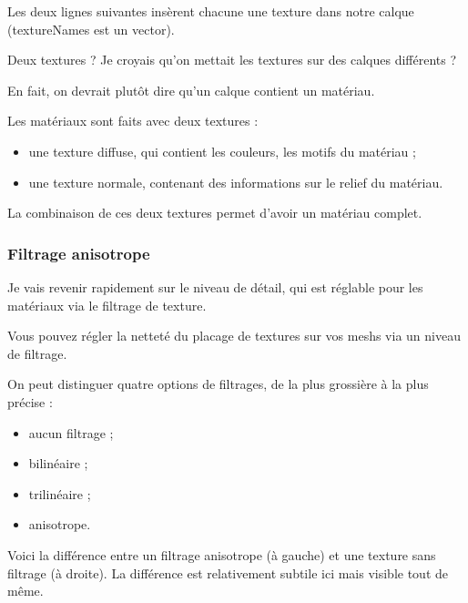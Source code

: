 Les deux lignes suivantes ins\`erent chacune une texture dans notre calque (textureNames est un vector).

Deux textures ? Je croyais qu'on mettait les textures sur des calques diff\'erents ?

En fait, on devrait plut\^ot dire qu'un calque contient un mat\'eriau.

Les mat\'eriaux sont faits avec deux textures :

\begin{itemize}
\item une texture diffuse, qui contient les couleurs, les motifs du mat\'eriau ;
\item une texture normale, contenant des informations sur le relief du mat\'eriau.
\end{itemize}
   

La combinaison de ces deux textures permet d'avoir un mat\'eriau complet.



\subsubsection{Filtrage anisotrope}


Je vais revenir rapidement sur le niveau de d\'etail, qui est r\'eglable pour les mat\'eriaux via le filtrage de texture.

Vous pouvez r\'egler la nettet\'e du placage de textures sur vos meshs via un niveau de filtrage.

On peut distinguer quatre options de filtrages, de la plus grossi\`ere \`a la plus pr\'ecise :

\begin{itemize}
\item aucun filtrage ;
\item bilin\'eaire ;
\item trilin\'eaire ;
\item anisotrope.
\end{itemize}


Voici la diff\'erence entre un filtrage anisotrope (\`a gauche) et une texture sans filtrage (\`a droite). La diff\'erence est relativement subtile ici mais visible tout de m\^eme.

